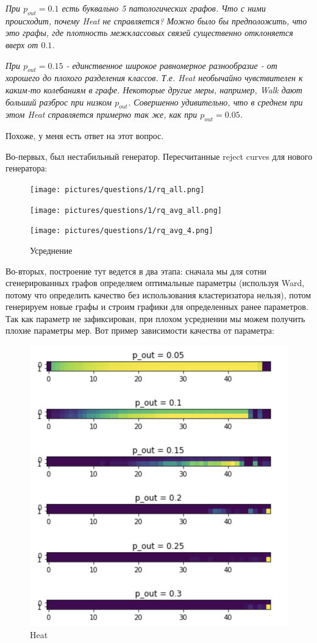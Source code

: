 \documentclass{article}
\begin{document}
\textit{При $p_{out} = 0.1$ есть буквально 5 патологических графов. Что с ними происходит, почему Heat не справляется? Можно было бы предположить, что это графы, где плотность межклассовых связей существенно отклоняется вверх от $0.1$.}
	
\textit{При $p_{out} = 0.15$ - единственное широкое равномерное разнообразие - от хорошего до плохого разделения классов. Т.е. Heat необычайно чувствителен к каким-то колебаниям в графе. Некоторые другие меры, например, Walk дают больший разброс при низком $p_{out}$. Совершенно удивительно, что в среднем при этом Heat справляется примерно так же, как при $p_{out} = 0.05$.}

Похоже, у меня есть ответ на этот вопрос. 

Во-первых, был нестабильный генератор. Пересчитанные reject curves для нового генератора:

\begin{figure}[H]
	\texttt{[image: pictures/questions/1/rq\_all.png]}
	\caption{\label{f_vs2}}
\end{figure}


\begin{figure}[H] %
	\begin{minipage}{.5\textwidth}
		\centerline{
			\texttt{[image: pictures/questions/1/rq\_avg\_all.png]}
		}
	\end{minipage}%
	\begin{minipage}{.5\textwidth}
		\centerline{
			\texttt{[image: pictures/questions/1/rq\_avg\_4.png]}
		}
	\end{minipage}%
\caption{\label{f_Rcur} Усреднение}
\end{figure}

Во-вторых, построение тут ведется в два этапа: сначала мы для сотни сгенерированных графов определяем оптимальные параметры (используя Ward, потому что определить качество без использования кластеризатора нельзя), потом генерируем новые графы и строим графики для определенных ранее параметров. Так как параметр не зафиксирован, при плохом усреднении мы можем получить плохие параметры мер. Вот пример зависимости качества от параметра:

\begin{figure}[H]
	\includegraphics[width=.5\linewidth]{pictures/questions/1/quality.jpeg}
	\caption{\label{f_vs2} Heat}
\end{figure}
\end{document}
